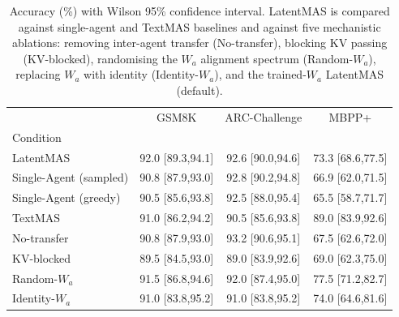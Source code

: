 \begin{table}
\caption{Accuracy (\%) with Wilson 95\% confidence interval. LatentMAS is compared against single-agent and TextMAS baselines and against five mechanistic ablations: removing inter-agent transfer (No-transfer), blocking KV passing (KV-blocked), randomising the $W_a$ alignment spectrum (Random-$W_a$), replacing $W_a$ with identity (Identity-$W_a$), and the trained-$W_a$ LatentMAS (default).}
\label{tab:main_accuracy}
\begin{tabular}{lccc}
\toprule
 & GSM8K & ARC-Challenge & MBPP+ \\
Condition &  &  &  \\
\midrule
LatentMAS & 92.0 [89.3,94.1] & 92.6 [90.0,94.6] & 73.3 [68.6,77.5] \\
Single-Agent (sampled) & 90.8 [87.9,93.0] & 92.8 [90.2,94.8] & 66.9 [62.0,71.5] \\
Single-Agent (greedy) & 90.5 [85.6,93.8] & 92.5 [88.0,95.4] & 65.5 [58.7,71.7] \\
TextMAS & 91.0 [86.2,94.2] & 90.5 [85.6,93.8] & 89.0 [83.9,92.6] \\
No-transfer & 90.8 [87.9,93.0] & 93.2 [90.6,95.1] & 67.5 [62.6,72.0] \\
KV-blocked & 89.5 [84.5,93.0] & 89.0 [83.9,92.6] & 69.0 [62.3,75.0] \\
Random-$W_a$ & 91.5 [86.8,94.6] & 92.0 [87.4,95.0] & 77.5 [71.2,82.7] \\
Identity-$W_a$ & 91.0 [83.8,95.2] & 91.0 [83.8,95.2] & 74.0 [64.6,81.6] \\
\bottomrule
\end{tabular}
\end{table}
